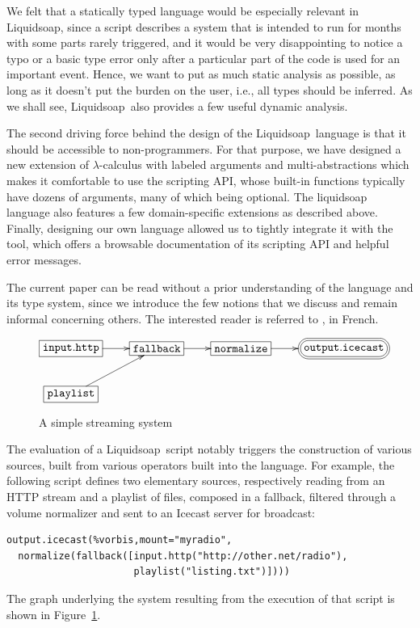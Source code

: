\documentclass{llncs}
\newcommand{\liquidsoap}{Liquidsoap}
\newcommand{\ie}{{i.e.,}}
\newcommand{\TODO}[1]{\marginpar{\tiny #1}}
\begin{document}
We felt that a statically typed language would be especially relevant
in \liquidsoap, since a script describes a system that is intended to run
for months with some parts rarely triggered, and it would be very 
disappointing to notice a typo or a basic type error only after a particular
part of the code is used for an important event.
Hence, we want to put as much static analysis as possible, as
long as it doesn't put the burden on the user, \ie{} all types should be
inferred. As we shall see, \liquidsoap\ also provides a few useful dynamic
analysis.

The second driving force behind the design of the \liquidsoap\ language
is that it should be accessible to non-programmers.
For that purpose, we have designed a new extension of $\lambda$-calculus
with labeled arguments and multi-abstractions 
\cite{baelde-mimram:webradio-lambda} which makes it comfortable to use
the scripting API, whose built-in functions typically have dozens of
arguments, many of which being optional.
The liquidsoap language also features a few domain-specific extensions
as described above.
Finally, designing our own language allowed us to tightly integrate
it with the tool, which offers a browsable documentation of its scripting
API and helpful error messages.

The current paper can be read without a prior understanding of
the language and its type system, since we introduce the few notions
that we discuss and remain informal concerning others.
The interested reader is referred to \cite{baelde-mimram:webradio-lambda},
in French.

\begin{figure}[t]
 \begin{center}
\label{fig:simple}
\[
\xymatrix{
  *+[F]{\mathtt{input.http}}\ar[r]&*+[F]{\mathtt{fallback}}\ar[r]&
  *+[F]{\mathtt{normalize}}\ar[r]&
  *+<10pt>[F=:<30pt>]{\mathtt{output.icecast}}\\
  *+[F]{\mathtt{playlist}}\ar[ur]&\\
}
\]
\end{center}
 \caption{A simple streaming system}
\end{figure}

The evaluation of a \liquidsoap\ script notably triggers the construction of
various sources, built from various operators built into the language.
For example, the following script defines two elementary sources,
respectively reading from an HTTP stream and a playlist of files,
composed in a fallback, filtered through a volume
normalizer and sent to an Icecast server for broadcast:
\TODO{DB define icecast}
\begin{verbatim}
output.icecast(%vorbis,mount="myradio",
  normalize(fallback([input.http("http://other.net/radio"),
                      playlist("listing.txt")])))
\end{verbatim}
The graph underlying the system resulting from the execution of that
script is shown in Figure~\ref{fig:simple}.
\end{document}
